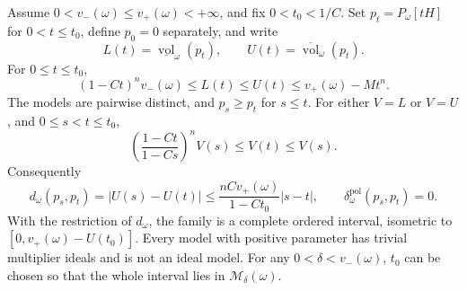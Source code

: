\begin{corollary}\label{cor:diffuse-hermitian-model-interval}
Assume $0<v_-(\omega)\leq v_+(\omega)<+\infty$, and fix $0<t_0<1/C$. Set $p_t=P_\omega[tH]$ for $0<t\leq t_0$, define $p_0=0$ separately, and write
\[
 L(t)=\underline{\operatorname{vol}}_\omega(p_t),\qquad
 U(t)=\overline{\operatorname{vol}}_\omega(p_t).
\]
For $0\leq t\leq t_0$,
\[
 (1-Ct)^n v_-(\omega)\leq L(t)\leq U(t)
       \leq v_+(\omega)-Mt^n.
\]
The models are pairwise distinct, and $p_s\geq p_t$ for $s\leq t$. For either $V=L$ or $V=U$, and $0\leq s<t\leq t_0$,
\[
 \left(\frac{1-Ct}{1-Cs}\right)^n V(s)
       \leq V(t)\leq V(s).
\]
Consequently
\[
 d_\omega(p_s,p_t)=|U(s)-U(t)|
       \leq\frac{nC v_+(\omega)}{1-Ct_0}|s-t|,
 \qquad
 \delta_\omega^{\mathrm{pol}}(p_s,p_t)=0.
\]
With the restriction of $d_\omega$, the family is a complete ordered interval, isometric to $[0,v_+(\omega)-U(t_0)]$. Every model with positive parameter has trivial multiplier ideals and is not an ideal model. For any $0<\delta<v_-(\omega)$, $t_0$ can be chosen so that the whole interval lies in $\mathcal M_\delta(\omega)$.
\end{corollary}
